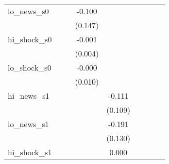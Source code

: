 {\begin{tabular}{l*{8}{c}}
\addlinespace
lo\_news\_s0  &                     &                     &      -0.100         &                     &                     &                     &                     &                     \\
            &                     &                     &     (0.147)         &                     &                     &                     &                     &                     \\
\addlinespace
hi\_shock\_s0 &                     &                     &      -0.001         &                     &                     &                     &                     &                     \\
            &                     &                     &     (0.004)         &                     &                     &                     &                     &                     \\
\addlinespace
lo\_shock\_s0 &                     &                     &      -0.000         &                     &                     &                     &                     &                     \\
            &                     &                     &     (0.010)         &                     &                     &                     &                     &                     \\
\addlinespace
hi\_news\_s1  &                     &                     &                     &      -0.111         &                     &                     &                     &                     \\
            &                     &                     &                     &     (0.109)         &                     &                     &                     &                     \\
\addlinespace
lo\_news\_s1  &                     &                     &                     &      -0.191         &                     &                     &                     &                     \\
            &                     &                     &                     &     (0.130)         &                     &                     &                     &                     \\
\addlinespace
hi\_shock\_s1 &                     &                     &                     &       0.000         &                     &                     &                     &                     \\

\end{tabular}}
